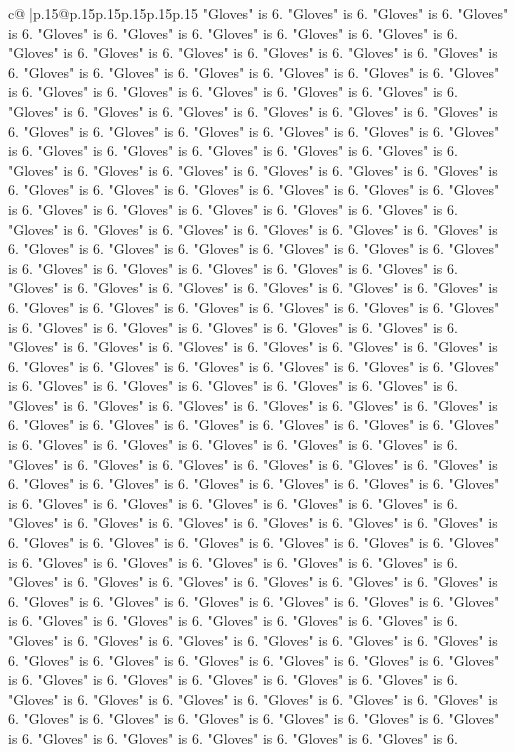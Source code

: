 \documentclass{article}
\begin{document}
{\begin{supertabular}{c@{$\;$}|p{.15\linewidth}@{}p{.15\linewidth}p{.15\linewidth}p{.15\linewidth}p{.15\linewidth}p{.15\linewidth}}
{{{"Gloves" is 6. "Gloves" is 6. "Gloves" is 6. "Gloves" is 6. "Gloves" is 6. "Gloves" is 6. "Gloves" is 6. "Gloves" is 6. "Gloves" is 6. "Gloves" is 6. "Gloves" is 6. "Gloves" is 6. "Gloves" is 6. "Gloves" is 6. "Gloves" is 6. "Gloves" is 6. "Gloves" is 6. "Gloves" is 6. "Gloves" is 6. "Gloves" is 6. "Gloves" is 6. "Gloves" is 6. "Gloves" is 6. "Gloves" is 6. "Gloves" is 6. "Gloves" is 6. "Gloves" is 6. "Gloves" is 6. "Gloves" is 6. "Gloves" is 6. "Gloves" is 6. "Gloves" is 6. "Gloves" is 6. "Gloves" is 6. "Gloves" is 6. "Gloves" is 6. "Gloves" is 6. "Gloves" is 6. "Gloves" is 6. "Gloves" is 6. "Gloves" is 6. "Gloves" is 6. "Gloves" is 6. "Gloves" is 6. "Gloves" is 6. "Gloves" is 6. "Gloves" is 6. "Gloves" is 6. "Gloves" is 6. "Gloves" is 6. "Gloves" is 6. "Gloves" is 6. "Gloves" is 6. "Gloves" is 6. "Gloves" is 6. "Gloves" is 6. "Gloves" is 6. "Gloves" is 6. "Gloves" is 6. "Gloves" is 6. "Gloves" is 6. "Gloves" is 6. "Gloves" is 6. "Gloves" is 6. "Gloves" is 6. "Gloves" is 6. "Gloves" is 6. "Gloves" is 6. "Gloves" is 6. "Gloves" is 6. "Gloves" is 6. "Gloves" is 6. "Gloves" is 6. "Gloves" is 6. "Gloves" is 6. "Gloves" is 6. "Gloves" is 6. "Gloves" is 6. "Gloves" is 6. "Gloves" is 6. "Gloves" is 6. "Gloves" is 6. "Gloves" is 6. "Gloves" is 6. "Gloves" is 6. "Gloves" is 6. "Gloves" is 6. "Gloves" is 6. "Gloves" is 6. "Gloves" is 6. "Gloves" is 6. "Gloves" is 6. "Gloves" is 6. "Gloves" is 6. "Gloves" is 6. "Gloves" is 6. "Gloves" is 6. "Gloves" is 6. "Gloves" is 6. "Gloves" is 6. "Gloves" is 6. "Gloves" is 6. "Gloves" is 6. "Gloves" is 6. "Gloves" is 6. "Gloves" is 6. "Gloves" is 6. "Gloves" is 6. "Gloves" is 6. "Gloves" is 6. "Gloves" is 6. "Gloves" is 6. "Gloves" is 6. "Gloves" is 6. "Gloves" is 6. "Gloves" is 6. "Gloves" is 6. "Gloves" is 6. "Gloves" is 6. "Gloves" is 6. "Gloves" is 6. "Gloves" is 6. "Gloves" is 6. "Gloves" is 6. "Gloves" is 6. "Gloves" is 6. "Gloves" is 6. "Gloves" is 6. "Gloves" is 6. "Gloves" is 6. "Gloves" is 6. "Gloves" is 6. "Gloves" is 6. "Gloves" is 6. "Gloves" is 6. "Gloves" is 6. "Gloves" is 6. "Gloves" is 6. "Gloves" is 6. "Gloves" is 6. "Gloves" is 6. "Gloves" is 6. "Gloves" is 6. "Gloves" is 6. "Gloves" is 6. "Gloves" is 6. "Gloves" is 6. "Gloves" is 6. "Gloves" is 6. "Gloves" is 6. "Gloves" is 6. "Gloves" is 6. "Gloves" is 6. "Gloves" is 6. "Gloves" is 6. "Gloves" is 6. "Gloves" is 6. "Gloves" is 6. "Gloves" is 6. "Gloves" is 6. "Gloves" is 6. "Gloves" is 6. "Gloves" is 6. "Gloves" is 6. "Gloves" is 6. "Gloves" is 6. "Gloves" is 6. "Gloves" is 6. "Gloves" is 6. "Gloves" is 6. "Gloves" is 6. "Gloves" is 6. "Gloves" is 6. "Gloves" is 6. "Gloves" is 6. "Gloves" is 6. "Gloves" is 6. "Gloves" is 6. "Gloves" is 6. "Gloves" is 6. "Gloves" is 6. "Gloves" is 6. "Gloves" is 6. "Gloves" is 6. "Gloves" is 6. "Gloves" is 6. "Gloves" is 6. "Gloves" is 6. "Gloves" is 6. "Gloves" is 6. "Gloves" is 6. "Gloves" is 6. "Gloves" is 6. "Gloves" is 6. "Gloves" is 6. "Gloves" is 6. "Gloves" is 6. "Gloves" is 6. "Gloves" is 6. "Gloves" is 6. "Gloves" is 6. "Gloves" is 6. "Gloves" is 6. "Gloves" is 6. "Gloves" is 6. "Gloves" is 6. "Gloves" is 6. "Gloves" is 6. "Gloves" is 6. "Gloves" is 6. "Gloves" is 6. "Gloves" is 6. "Gloves" is 6. }}}
\end{supertabular}}
\end{document}
